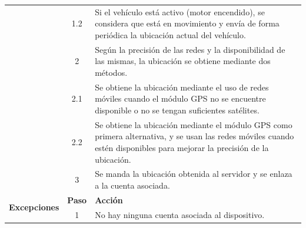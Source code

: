 \begin{table}[H]
\begin{tabularx}{\textwidth}{|c|c|X|}
    \cline{2-3}
                                                & 1.2                                                                                              & \multicolumn{1}{L|}{Si el vehículo está activo (motor encendido), se considera que está en movimiento y envía de forma periódica la ubicación actual del vehículo.}                           \\
    \cline{2-3}
                                                & 2                                                                                                & \multicolumn{1}{L|}{Según la precisión de las redes y la disponibilidad de las mismas, la ubicación se obtiene mediante dos métodos.}                                                         \\
    \cline{2-3}
                                                & 2.1                                                                                              & \multicolumn{1}{L|}{Se obtiene la ubicación mediante el uso de redes móviles cuando el módulo GPS no se encuentre disponible o no se tengan suficientes satélites.}                           \\
    \cline{2-3}
                                                & 2.2                                                                                              & \multicolumn{1}{L|}{Se obtiene la ubicación mediante el módulo GPS como primera alternativa, y se usan las redes móviles cuando estén disponibles para mejorar la precisión de la ubicación.} \\
    \cline{2-3}
                                                & 3                                                                                                & \multicolumn{1}{L|}{Se manda la ubicación obtenida al servidor y se enlaza a la cuenta asociada.}                                                                                             \\
    \hline
    \multirow{6}{*}{\textbf{Excepciones}}       & \textbf{Paso}                                                                                    & \textbf{Acción}                                                                                                                                                                               \\
    \cline{2-3}
                                                & 1                                                                                                & \multicolumn{1}{L|}{No hay ninguna cuenta asociada al dispositivo.}                                                                                                                           \\

\end{tabularx}
\end{table}
